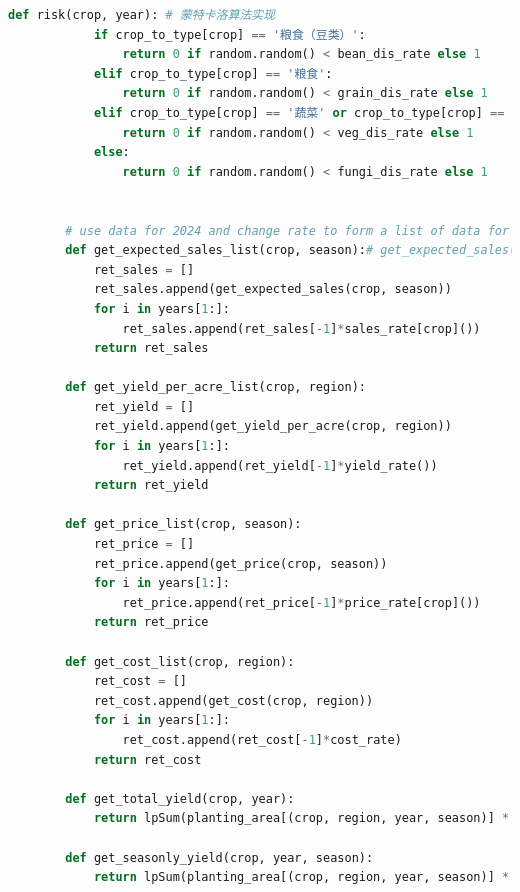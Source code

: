 \documentclass{cumcmthesis}
\begin{document}
\begin{appendices}
\begin{lstlisting}[language=python]
        def risk(crop, year): # 蒙特卡洛算法实现
            if crop_to_type[crop] == '粮食（豆类）':
                return 0 if random.random() < bean_dis_rate else 1
            elif crop_to_type[crop] == '粮食':
                return 0 if random.random() < grain_dis_rate else 1
            elif crop_to_type[crop] == '蔬菜' or crop_to_type[crop] == '蔬菜（豆类）':
                return 0 if random.random() < veg_dis_rate else 1
            else:
                return 0 if random.random() < fungi_dis_rate else 1
    
    
        # use data for 2024 and change rate to form a list of data for 2024-2030
        def get_expected_sales_list(crop, season):# get_expected_sales(crop, season)[year-2024]
            ret_sales = []
            ret_sales.append(get_expected_sales(crop, season))
            for i in years[1:]:
                ret_sales.append(ret_sales[-1]*sales_rate[crop]())
            return ret_sales
        
        def get_yield_per_acre_list(crop, region):
            ret_yield = []
            ret_yield.append(get_yield_per_acre(crop, region))
            for i in years[1:]:
                ret_yield.append(ret_yield[-1]*yield_rate())
            return ret_yield
        
        def get_price_list(crop, season):
            ret_price = []
            ret_price.append(get_price(crop, season))
            for i in years[1:]:
                ret_price.append(ret_price[-1]*price_rate[crop]())
            return ret_price
        
        def get_cost_list(crop, region):
            ret_cost = []
            ret_cost.append(get_cost(crop, region))
            for i in years[1:]:
                ret_cost.append(ret_cost[-1]*cost_rate)
            return ret_cost
        
        def get_total_yield(crop, year):
            return lpSum(planting_area[(crop, region, year, season)] * get_yield_per_acre_list(crop, region)[year-2024] for region in regions for season in seasons)
        
        def get_seasonly_yield(crop, year, season):
            return lpSum(planting_area[(crop, region, year, season)] * get_yield_per_acre_list(crop, region)[year-2024] for region in regions)
        

\end{lstlisting}
\end{appendices}
\end{document}
